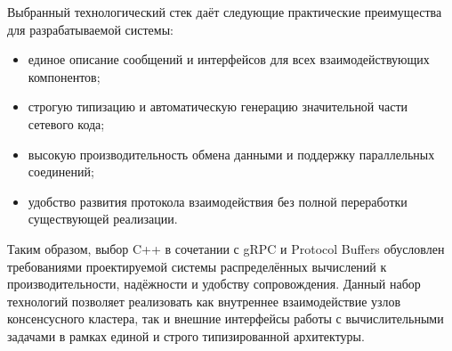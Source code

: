 Выбранный технологический стек даёт следующие практические преимущества для
разрабатываемой системы:
\begin{itemize}
    \item единое описание сообщений и интерфейсов для всех взаимодействующих
компонентов;
    \item строгую типизацию и автоматическую генерацию значительной части
сетевого кода;
    \item высокую производительность обмена данными и поддержку параллельных
соединений;
    \item удобство развития протокола взаимодействия без полной переработки
существующей реализации.
\end{itemize}

Таким образом, выбор C++ в сочетании с gRPC и Protocol Buffers обусловлен
требованиями проектируемой системы распределённых вычислений к
производительности, надёжности и удобству сопровождения. Данный набор
технологий позволяет реализовать как внутреннее взаимодействие узлов
консенсусного кластера, так и внешние интерфейсы работы с вычислительными
задачами в рамках единой и строго типизированной архитектуры.
